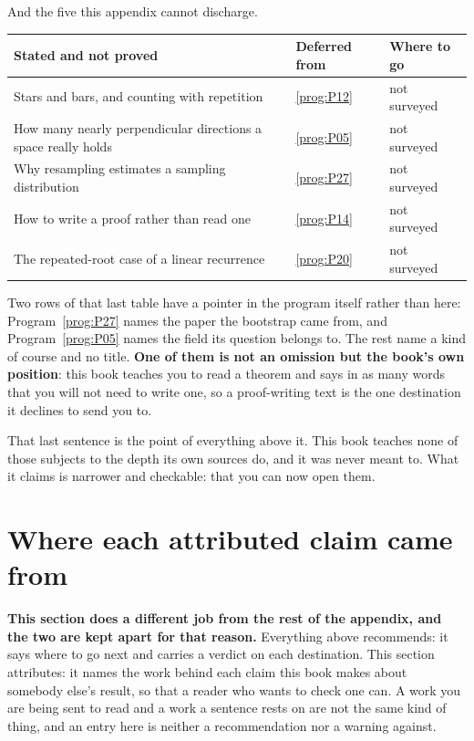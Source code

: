 \medskip
And the five this appendix cannot discharge.

\begin{center}
\begin{tabularx}{\linewidth}{@{}Xll@{}}
\toprule
\textbf{Stated and not proved} & \textbf{Deferred from}
  & \textbf{Where to go} \\
\midrule
Stars and bars, and counting with repetition &
  \ref{prog:P12} & not surveyed \\
How many nearly perpendicular directions a space really holds &
  \ref{prog:P05} & not surveyed \\
Why resampling estimates a sampling distribution &
  \ref{prog:P27} & not surveyed \\
How to write a proof rather than read one &
  \ref{prog:P14} & not surveyed \\
The repeated-root case of a linear recurrence &
  \ref{prog:P20} & not surveyed \\
\bottomrule
\end{tabularx}
\end{center}

\medskip
Two rows of that last table have a pointer in the program itself rather than
here: Program~\ref{prog:P27} names the paper the bootstrap came from, and
Program~\ref{prog:P05} names the field its question belongs to. The rest name
a kind of course and no title. \textbf{One of them is not an omission but the
book's own position}: this book teaches you to read a theorem and says in as
many words that you will not need to write one, so a proof-writing text is the
one destination it declines to send you to.

\medskip
That last sentence is the point of everything above it. This book teaches none
of those subjects to the depth its own sources do, and it was never meant to.
What it claims is narrower and checkable: that you can now open them.

\section{Where each attributed claim came from}
\label{sec:E-sources}

\textbf{This section does a different job from the rest of the appendix, and
the two are kept apart for that reason.} Everything above recommends: it says
where to go next and carries a verdict on each destination. This section
attributes: it names the work behind each claim this book makes about somebody
else's result, so that a reader who wants to check one can. A work you are
being sent to read and a work a sentence rests on are not the same kind of
thing, and an entry here is neither a recommendation nor a warning against.

